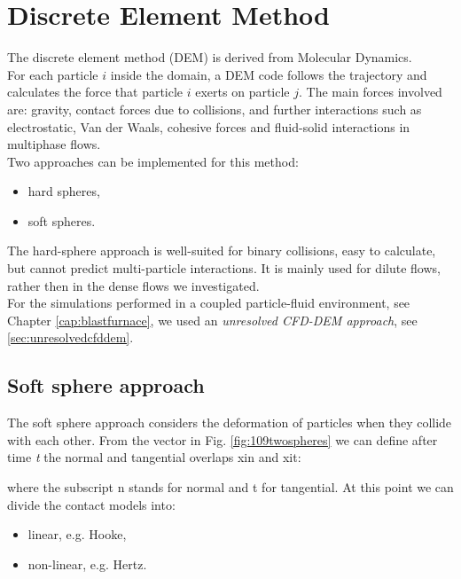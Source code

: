 
\chapter{Discrete Element Method}
\label{cap:dem}

The discrete element method (\acs{DEM}) is derived from Molecular Dynamics. \\ 
For each particle $i$ inside the domain, a \acs{DEM} code
follows the trajectory and calculates the force that particle $i$ exerts on
particle $j$.
The main forces involved are: gravity, contact forces due to collisions, and
further interactions such as electrostatic, Van der Waals, cohesive forces and fluid-solid interactions in 
multiphase flows. \\
Two approaches can be implemented for this method:
\begin{itemize}
  \item{hard spheres,}
  \item{soft spheres.}
\end{itemize} 
The hard-sphere approach is well-suited for binary collisions, easy to
calculate, but cannot predict multi-particle interactions.
It is mainly used for dilute flows, rather then in the dense flows we
investigated.\\
For the simulations performed in a coupled particle-fluid environment, see
Chapter \ref{cap:blastfurnace}, we used an \textit{unresolved
\acs{CFD}-\acs{DEM} approach}, see \ref{sec:unresolvedcfddem}.


\section{Soft sphere approach}
\label{sec:softspheresapproach}


The soft sphere approach considers the deformation of particles when they
collide with each other. From the vector in Fig. \ref{fig:109twospheres} we can
define after time \textit{t} the normal and tangential overlaps \acs{xin} and
\acs{xit}:


where the subscript \acs{n} stands for normal and \acs{t} for tangential. 
At this point we can divide the contact models into:
\begin{itemize}
  \item{linear, e.g. Hooke,}
  \item{non-linear, e.g. Hertz.}
\end{itemize}

